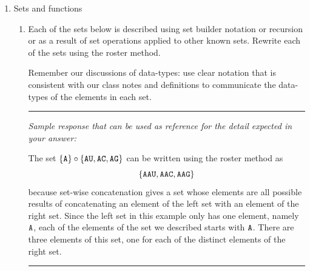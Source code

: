\begin{enumerate}[labelindent=0pt, leftmargin=0pt]
\begin{enumerate}[labelindent=0pt, leftmargin=0pt]
        Can you find two different $3$-tuples that represent colors that are indistinguishable to your eye? You can use the website in the footnote to play around
        with different choices of red, green, and blue levels to see if you can distinguish between the resulting colors.
        Why or why not? 

        A complete answer will include the specific example $3$-tuples that work, along with a description of the colors that they represent and why they
        are indistinguishable, or an explanation of why there can't be such an example.
    \end{enumerate}

    \item Sets and functions
    \begin{enumerate}
        \item Each of the sets below is described 
using set builder notation or recursion or as a result of set operations
applied to other known sets.  Rewrite each of the sets using the roster method.

Remember our discussions of data-types: use clear notation that 
is consistent with our class notes and definitions 
to communicate the data-types of the elements in each set.


\rule{0.5\textwidth}{.4pt}

{\it Sample response that can be used as reference for the detail expected 
in your answer:} 

The set $\{ \texttt{A} \} \circ \{ \texttt{A}\texttt{U}, \texttt{A}\texttt{C}, \texttt{A}\texttt{G}\}$ can be written using
the roster method as 
\[
\{ \texttt{A}\texttt{A}\texttt{U}, \texttt{A}\texttt{A}\texttt{C}, \texttt{A}\texttt{A}\texttt{G} \}
\]
because set-wise concatenation gives a set whose elements are 
all possible results of concatenating an element of the 
left set with an 
element of the right set. Since the left set in this example only
has one element, namely $\texttt{A}$, each of the elements of the set we 
described starts with $\texttt{A}$. There are three elements of this set, 
one for each of the distinct elements of the right set.

\rule{0.5\textwidth}{.4pt}


\end{enumerate}
\end{enumerate}

